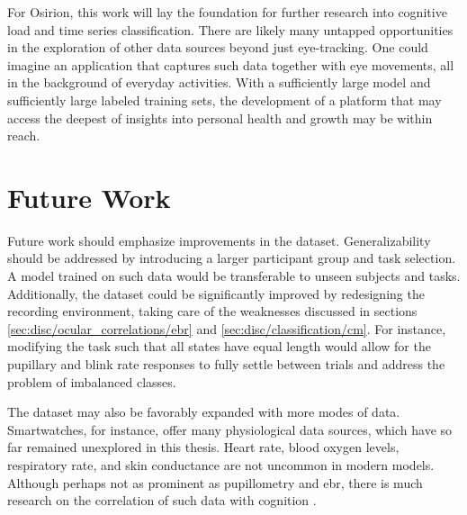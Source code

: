 For Osirion, this work will lay the foundation for further research into cognitive load and time series classification. There are likely many untapped opportunities in the exploration of other data sources beyond just eye-tracking. One could imagine an application that captures such data together with eye movements, all in the background of everyday activities. With a sufficiently large model and sufficiently large labeled training sets, the development of a platform that may access the deepest of insights into personal health and growth may be within reach. 



\section{Future Work}

Future work should emphasize improvements in the dataset. 
Generalizability sho\-uld be addressed by introducing a larger participant group and task selection. A model trained on such data would be transferable to unseen subjects and tasks. Additionally, the dataset could be significantly improved by redesigning the recording environment, taking care of the weaknesses discussed in sections \ref{sec:disc/ocular_correlations/ebr} and \ref{sec:disc/classification/cm}. For instance, modifying the task such that all states have equal length would allow for the pupillary and blink rate responses to fully settle between trials and address the problem of imbalanced classes.

The dataset may also be favorably expanded with more modes of data. Smartwatches, for instance, offer many physiological data sources, which have so far remained unexplored in this thesis. Heart rate, blood oxygen levels, respiratory rate, and skin conductance are not uncommon in modern models. Although perhaps not as prominent as pupillometry and \acrshort{ebr}, there is much research on the correlation of such data with cognition \cite{paas1994A, solhjoo2019, setz2010, ikehara2005, choi2014}.








